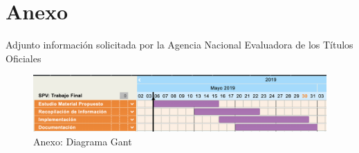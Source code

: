 \documentclass[a4paper,11pt]{book}
\begin{document}
\chapter{ Anexo}

Adjunto información solicitada por la Agencia Nacional Evaluadora de los Títulos Oficiales

\begin{figure}[H]  
\centering 
\includegraphics[scale=0.40]{imagenes/gant.png}
\caption{ Anexo: Diagrama Gant}  
\end{figure} 
\end{document}
